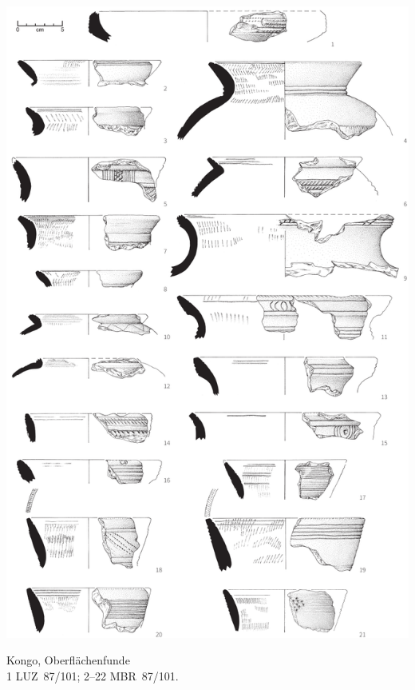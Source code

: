 \begin{pl}[H]
	\includegraphics{plt/Taf28.pdf}
	\vspace{.75em}\caption{Kongo, Oberflächenfunde \\ 1 LUZ~87/101; 2--22 MBR~87/101.}
	\label{pl:28}
\end{pl}


